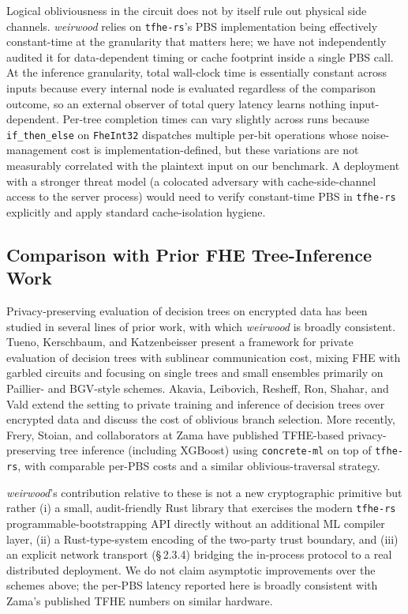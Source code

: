 \documentclass[12pt]{article}
\begin{document}
Logical obliviousness in the circuit does not by itself rule out physical side channels. \textit{weirwood} relies on \texttt{tfhe-rs}'s PBS implementation being effectively constant-time at the granularity that matters here; we have not independently audited it for data-dependent timing or cache footprint inside a single PBS call. At the inference granularity, total wall-clock time is essentially constant across inputs because every internal node is evaluated regardless of the comparison outcome, so an external observer of total query latency learns nothing input-dependent. Per-tree completion times can vary slightly across runs because \texttt{if\_then\_else} on \texttt{FheInt32} dispatches multiple per-bit operations whose noise-management cost is implementation-defined, but these variations are not measurably correlated with the plaintext input on our benchmark. A deployment with a stronger threat model (a colocated adversary with cache-side-channel access to the server process) would need to verify constant-time PBS in \texttt{tfhe-rs} explicitly and apply standard cache-isolation hygiene.

\subsection{Comparison with Prior FHE Tree-Inference Work}

Privacy-preserving evaluation of decision trees on encrypted data has been studied in several lines of prior work, with which \textit{weirwood} is broadly consistent. Tueno, Kerschbaum, and Katzenbeisser \cite{tueno} present a framework for private evaluation of decision trees with sublinear communication cost, mixing FHE with garbled circuits and focusing on single trees and small ensembles primarily on Paillier- and BGV-style schemes. Akavia, Leibovich, Resheff, Ron, Shahar, and Vald \cite{akavia} extend the setting to private training and inference of decision trees over encrypted data and discuss the cost of oblivious branch selection. More recently, Frery, Stoian, and collaborators at Zama \cite{frery} have published TFHE-based privacy-preserving tree inference (including XGBoost) using \texttt{concrete-ml} on top of \texttt{tfhe-rs}, with comparable per-PBS costs and a similar oblivious-traversal strategy.

\textit{weirwood}'s contribution relative to these is not a new cryptographic primitive but rather (i) a small, audit-friendly Rust library that exercises the modern \texttt{tfhe-rs} programmable-bootstrapping API directly without an additional ML compiler layer, (ii) a Rust-type-system encoding of the two-party trust boundary, and (iii) an explicit network transport (\S\,2.3.4) bridging the in-process protocol to a real distributed deployment. We do not claim asymptotic improvements over the schemes above; the per-PBS latency reported here is broadly consistent with Zama's published TFHE numbers on similar hardware.
\end{document}
